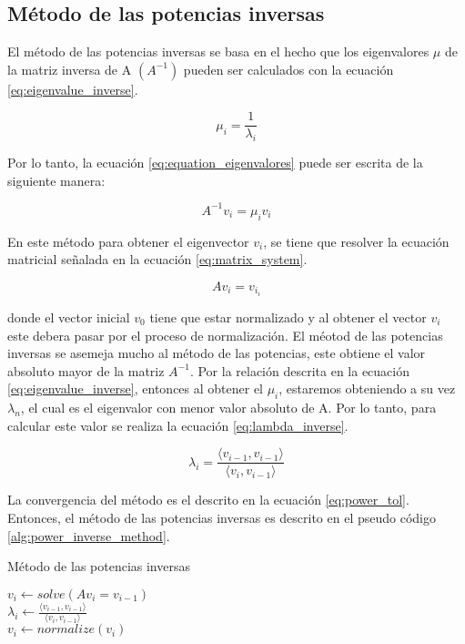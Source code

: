 \subsection{Método de las potencias inversas}

El método de las potencias inversas se basa en el hecho que los eigenvalores $\mu$ de la matriz inversa de A $(A^{-1})$ pueden ser calculados con la ecuación \ref{eq:eigenvalue_inverse}.

\begin{equation}
    \mu_i = \frac{1}{\lambda_i} \label{eq:eigenvalue_inverse}
\end{equation}

Por lo tanto, la ecuación \ref{eq:equation_eigenvalores} puede ser escrita de la siguiente manera:

\begin{equation}
    A^{-1} v_i = \mu_i  v_i
\end{equation}

En este método para obtener el eigenvector $v_i$, se tiene que resolver la ecuación matricial señalada en la ecuación \ref{eq:matrix_system}.

\begin{equation}
    Av_{i} = v_{i_i} \label{eq:matrix_system}
\end{equation}

donde el vector inicial $v_0$ tiene que estar normalizado y al obtener el vector $v_{i}$ este debera pasar por el proceso de normalización. El méotod de las potencias inversas se asemeja mucho al método de las potencias, este obtiene el valor absoluto mayor de la matriz $A^{-1}$. Por la relación descrita en la ecuación \ref{eq:eigenvalue_inverse}, entonces al obtener el $\mu_i$, estaremos obteniendo a su vez $\lambda_n$, el cual es el eigenvalor con menor valor absoluto de A. Por lo tanto, para calcular este valor se realiza la ecuación \ref{eq:lambda_inverse}.

\begin{equation}
    \lambda_i = \frac{\langle v_{i-1}, v_{i-1}\rangle}{\langle v_i , v_{i-1}\rangle} \label{eq:lambda_inverse}
\end{equation}

La convergencia del método es el descrito en la ecuación \ref{eq:power_tol}. Entonces, el método de las potencias inversas es descrito en el pseudo código \ref{alg:power_inverse_method}.

\begin{algorithm}[H]
    \caption{Método de las potencias inversas}
    \label{alg:power_inverse_method}
    {
    $v_i \gets solve(Av_{i}=v_{i-1})$\\
    $\lambda_i \gets \frac{\langle v_{i-1} , v_{i-1}\rangle}{\langle v_{i}, v_{i-1}\rangle}$\\
    $v_i \gets normalize(v_i)$\\
    }
\end{algorithm}